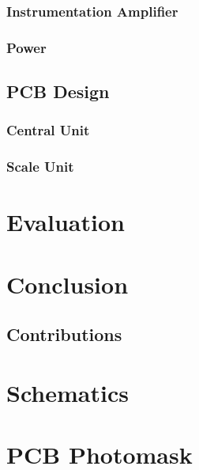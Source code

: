 \documentclass{l3proj}
\begin{document}
\subsection{Instrumentation Amplifier}
\label{ina}

\label{sec:ina}

\subsection{Power}


\section{PCB Design}
\label{pcb}


\subsection{Central Unit}

%

\subsection{Scale Unit}

%
\chapter{Evaluation}

\chapter{Conclusion}


\section{Contributions}



\newpage
\appendix
\chapter{Schematics}
\chapter{PCB Photomask}




\end{document}
